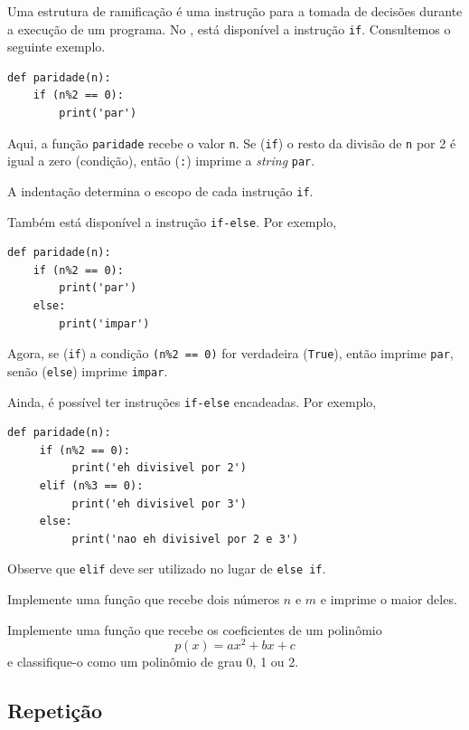 \documentclass[12pt]{article}
\begin{document}
Uma estrutura de ramificação é uma instrução para a tomada de decisões durante a execução de um programa. No {\python}, está disponível a instrução \lstinline+if+. Consultemos o seguinte exemplo.
\begin{lstlisting}
def paridade(n):
    if (n%2 == 0):
        print('par')
\end{lstlisting}
Aqui, a função \lstinline+paridade+ recebe o valor \lstinline+n+. Se (\lstinline+if+) o resto da divisão de \lstinline+n+ por 2 é igual a zero (condição), então (\lstinline+:+) imprime a {\it string} \lstinline+par+.

\begin{obs}
  A indentação determina o escopo de cada instrução \lstinline+if+.
\end{obs}

Também está disponível a instrução \lstinline+if-else+. Por exemplo,
\begin{lstlisting}
def paridade(n):
    if (n%2 == 0):
        print('par')
    else:
        print('impar')    
\end{lstlisting}
Agora, se (\lstinline+if+) a condição \lstinline!(n%2 == 0)! for verdadeira (\lstinline+True+), então imprime \lstinline+par+, senão (\lstinline+else+) imprime \lstinline+impar+.

Ainda, é possível ter instruções \lstinline+if-else+ encadeadas. Por exemplo,
\begin{lstlisting}
def paridade(n):
     if (n%2 == 0):
          print('eh divisivel por 2')
     elif (n%3 == 0):
          print('eh divisivel por 3')
     else:
          print('nao eh divisivel por 2 e 3')    
\end{lstlisting}
Observe que \lstinline+elif+ deve ser utilizado no lugar de \lstinline+else if+.

\begin{exr}
  Implemente uma função que recebe dois números $n$ e $m$ e imprime o maior deles.
\end{exr}

\begin{exr}
  Implemente uma função que recebe os coeficientes de um polinômio
  \begin{equation}
    p(x) = ax^2 + bx + c
  \end{equation}
  e classifique-o como um polinômio de grau 0, 1 ou 2.
\end{exr}

\subsection{Repetição}
\end{document}
